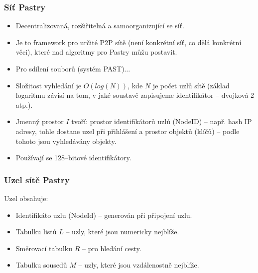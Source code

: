 \documentclass[11pt,a4paper]{article}
\begin{document}
\subsubsection{Síť Pastry}
\begin{itemize}
\item Decentralizovaná, rozšiřitelná a samoorganizující se síť.
\item Je to framework pro určité P2P sítě (není konkrétní síť, co dělá konkrétní věci), které nad algoritmy pro Pastry můžu postavit. 
\item Pro sdílení souborů (systém PAST)$\ldots$
\item Složitost vyhledání je $O(log(N))$, kde $N$ je počet uzlů sítě (základ logaritmu závisí na tom, v jaké soustavě zapisujeme identifikátor -- dvojková 2 atp.).
\item Jmenný prostor $I$ tvoří: prostor identifikátorů uzlů (NodeID) -- např. hash IP adresy, tohle dostane uzel při přihlášení a prostor objektů (klíčů) -- podle tohoto jsou vyhledávány objekty.
\item Používají se 128--bitové identifikátory.
\end{itemize}

\subsubsection{Uzel sítě Pastry}
Uzel obsahuje:
\begin{itemize}
\item Identifikáto uzlu (NodeId) -- generován při připojení uzlu.
\item Tabulku listů $L$ -- uzly, které jsou numericky nejblíže.
\item Směrovací tabulku $R$ -- pro hledání cesty.
\item Tabulku sousedů $M$ -- uzly, které jsou vzdálenostně nejblíže.
\end{itemize}
\end{document}
